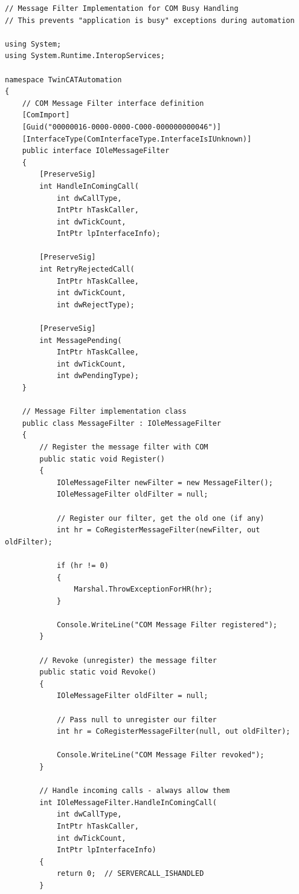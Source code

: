 \documentclass[11pt,a4paper]{article}
\begin{document}
\begin{lstlisting}[style=csharpstyle]
// Message Filter Implementation for COM Busy Handling
// This prevents "application is busy" exceptions during automation

using System;
using System.Runtime.InteropServices;

namespace TwinCATAutomation
{
    // COM Message Filter interface definition
    [ComImport]
    [Guid("00000016-0000-0000-C000-000000000046")]
    [InterfaceType(ComInterfaceType.InterfaceIsIUnknown)]
    public interface IOleMessageFilter
    {
        [PreserveSig]
        int HandleInComingCall(
            int dwCallType,
            IntPtr hTaskCaller,
            int dwTickCount,
            IntPtr lpInterfaceInfo);

        [PreserveSig]
        int RetryRejectedCall(
            IntPtr hTaskCallee,
            int dwTickCount,
            int dwRejectType);

        [PreserveSig]
        int MessagePending(
            IntPtr hTaskCallee,
            int dwTickCount,
            int dwPendingType);
    }

    // Message Filter implementation class
    public class MessageFilter : IOleMessageFilter
    {
        // Register the message filter with COM
        public static void Register()
        {
            IOleMessageFilter newFilter = new MessageFilter();
            IOleMessageFilter oldFilter = null;
            
            // Register our filter, get the old one (if any)
            int hr = CoRegisterMessageFilter(newFilter, out oldFilter);
            
            if (hr != 0)
            {
                Marshal.ThrowExceptionForHR(hr);
            }
            
            Console.WriteLine("COM Message Filter registered");
        }

        // Revoke (unregister) the message filter
        public static void Revoke()
        {
            IOleMessageFilter oldFilter = null;
            
            // Pass null to unregister our filter
            int hr = CoRegisterMessageFilter(null, out oldFilter);
            
            Console.WriteLine("COM Message Filter revoked");
        }

        // Handle incoming calls - always allow them
        int IOleMessageFilter.HandleInComingCall(
            int dwCallType,
            IntPtr hTaskCaller,
            int dwTickCount,
            IntPtr lpInterfaceInfo)
        {
            return 0;  // SERVERCALL_ISHANDLED
        }


\end{lstlisting}
\end{document}
